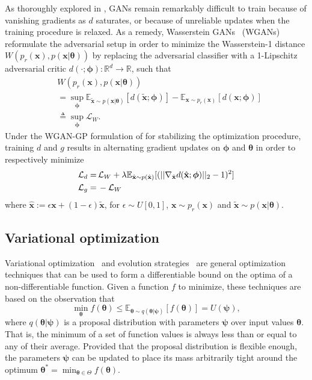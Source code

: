 \documentclass{article}
\newcommand{\bftheta}{{\bm \theta}}
\newcommand{\bfpsi}{{\bm \psi}}
\newcommand{\bfphi}{{\bm \phi}}
\theoremstyle{plain}
\begin{document}
As thoroughly explored in \cite{2017arXiv170104862A}, GANs remain remarkably
difficult to train because of vanishing gradients as $d$ saturates, or because of
unreliable updates when the training procedure is relaxed. As a remedy,
Wasserstein GANs~\cite{2017arXiv170107875A} (WGANs) reformulate the adversarial
setup in order to minimize the Wasserstein-1 distance $W( p_r(\mathbf{x} ), p(\mathbf{x} | \bftheta)  )$
by replacing the adversarial classifier with a 1-Lipschitz adversarial critic
$d(\cdot; \bfphi) : \mathbb{R}^d \to \mathbb{R}$, such that
\begin{align}
& W( p_r(\mathbf{x} ), p(\mathbf{x} | \bftheta)  ) \nonumber \\
&= \sup_{\bfphi}  \mathbb{E}_{\tilde{\mathbf{x}}\sim p(\mathbf{x}|\bftheta)} [d(\tilde{\mathbf{x}}; \bfphi)] - \mathbb{E}_{\mathbf{x} \sim p_r(\mathbf{x})} [d(\mathbf{x}; \bfphi)] \nonumber \\
&\triangleq \sup_{\bfphi} \mathcal{L}_W.
\end{align}
Under the WGAN-GP formulation of \cite{2017arXiv170400028G}
for stabilizing the optimization procedure,
training $d$ and $g$ results in alternating gradient updates on $\bfphi$ and $\bftheta$ in order to respectively minimize
\begin{align}
    {\cal L}_d =\,&  \mathcal{L}_W + \lambda \mathbb{E}_{\hat{\mathbf{x}} \sim p({\hat{\mathbf{x}})}} [(|| \nabla_{\hat{\mathbf{x}}} d({\hat{\mathbf{x}}};\bfphi) ||_2 - 1)^2] \\
    {\cal L}_g =\,& - \mathcal{L}_W
\end{align}
where ${\hat{\mathbf{x}}} := \epsilon \mathbf{x} +
(1-\epsilon)\tilde{\mathbf{x}}$, for $\epsilon \sim U[0,1]$, $\mathbf{x} \sim
p_r(\mathbf{x})$ and $\tilde{\mathbf{x}} \sim p(\mathbf{x}|\bftheta)$.


\subsection{Variational optimization}

Variational optimization~\cite{2012arXiv1212.4507S,staines2013optimization} and evolution strategies~\cite{2011arXiv1106.4487W} are general
optimization techniques that can be used to form a differentiable bound
on the optima of a non-differentiable function. Given a function $f$ to minimize,
these techniques are based on the observation that
\begin{equation}
    \min_{\bftheta} f(\bftheta) \leq \mathbb{E}_{\bftheta \sim q(\bftheta|\bfpsi)} [f(\bftheta)] = U(\bfpsi),
\end{equation}
where $q(\bftheta|\bfpsi)$ is a proposal distribution with parameters $\bfpsi$ over input values $\bftheta$.
That is, the minimum of a set of function values is always less than or equal
to any of their average. Provided that the proposal distribution is flexible enough, the parameters $\bfpsi$
can be updated to place its mass arbitrarily tight around the optimum $\bftheta^* = \min_{\bftheta \in \Theta} f(\bftheta)$.
\end{document}
